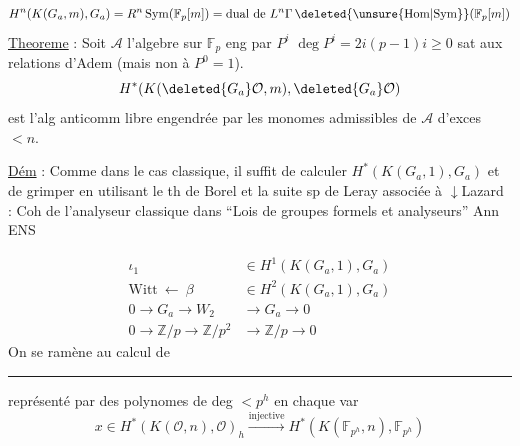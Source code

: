 \[
H^n(K(G_a,m),G_a)=R^n\operatorname{Sym}(\mathbb F_p[m])
=\text{dual de }L^n\Gamma\,\deleted{\unsure{\mathrm{Hom}|\mathrm{Sym}}}(\mathbb F_p[m])
\]
\uline{Theoreme} : Soit $\mathscr A$ l'algebre sur $\mathbb F_p$ eng par $P^i$\qquad
$\deg P^i=2i(p-1)$\qquad $i\geq0$ sat aux relations d'Adem (mais non à $P^0=1$).
\[
H^*(K(\deleted{G_a}\mathcal O,m),\deleted{G_a}\mathcal O)
\]
est l'alg anticomm libre engendrée par les monomes admissibles de $\mathscr A$ d'exces $<n$.

\uline{Dém} : Comme dans le cas classique, il suffit de calculer $H^*(K(G_a,1),G_a)$ et de grimper en utilisant le th de Borel et la suite sp de Leray associée à
$\downarrow$\quad Lazard : Coh de l'analyseur classique dans ``Lois de groupes formels et analyseurs'' Ann ENS

\[
\begin{aligned}
\iota_1&\in H^1(K(G_a,1),G_a)\\
\text{Witt}\ \longleftarrow\ \beta&\in H^2(K(G_a,1),G_a)\\
0\to G_a\to W_2&\to G_a\to0\\
0\to\mathbb Z/p\to\mathbb Z/p^2&\to\mathbb Z/p\to0
\end{aligned}
\]
On se ramène au calcul de
\noindent\rule{.8\linewidth}{.3pt}

représenté par des polynomes de deg $<p^h$ en chaque var
\[
x\in H^*(K(\mathcal O,n),\mathcal O)_h\xrightarrow{\text{injective}}H^*(K(\mathbb F_{p^h},n),\mathbb F_{p^h})
\]
